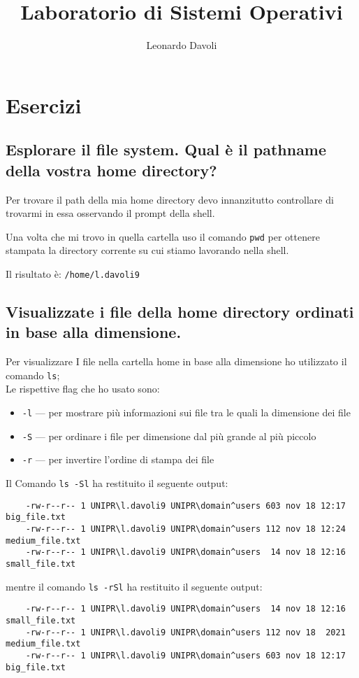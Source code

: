 \documentclass{article}
\author{Leonardo Davoli}
\title{Laboratorio di Sistemi Operativi}
\begin{document}
\maketitle

\section{Esercizi}

\subsection{Esplorare il file system. Qual è il pathname della vostra home directory?}
Per trovare il path della mia home directory devo innanzitutto controllare di trovarmi in essa osservando il prompt della shell.

Una volta che mi trovo in quella cartella uso il comando \texttt{pwd} 
per ottenere stampata la directory corrente su cui stiamo lavorando nella shell.

Il risultato è: \texttt{/home/l.davoli9}

\subsection{Visualizzate i file della home directory ordinati in base alla dimensione.}
Per visualizzare I file nella cartella home in base alla dimensione ho utilizzato il comando \texttt{ls};\\
Le rispettive flag che ho usato sono:
\begin{itemize}
    \item \texttt{-l} --- per mostrare più informazioni sui file tra le quali la dimensione dei file
    \item \texttt{-S} --- per ordinare i file per dimensione dal più grande al più piccolo
    \item \texttt{-r} --- per invertire l'ordine di stampa dei file
\end{itemize}

Il Comando \texttt{ls -Sl} ha restituito il seguente output:
\begin{verbatim}
    -rw-r--r-- 1 UNIPR\l.davoli9 UNIPR\domain^users 603 nov 18 12:17 big_file.txt
    -rw-r--r-- 1 UNIPR\l.davoli9 UNIPR\domain^users 112 nov 18 12:24 medium_file.txt
    -rw-r--r-- 1 UNIPR\l.davoli9 UNIPR\domain^users  14 nov 18 12:16 small_file.txt
\end{verbatim}
mentre il comando \texttt{ls -rSl} ha restituito il seguente output:
\begin{verbatim}
    -rw-r--r-- 1 UNIPR\l.davoli9 UNIPR\domain^users  14 nov 18 12:16 small_file.txt
    -rw-r--r-- 1 UNIPR\l.davoli9 UNIPR\domain^users 112 nov 18  2021 medium_file.txt
    -rw-r--r-- 1 UNIPR\l.davoli9 UNIPR\domain^users 603 nov 18 12:17 big_file.txt
\end{verbatim}
\end{document}
